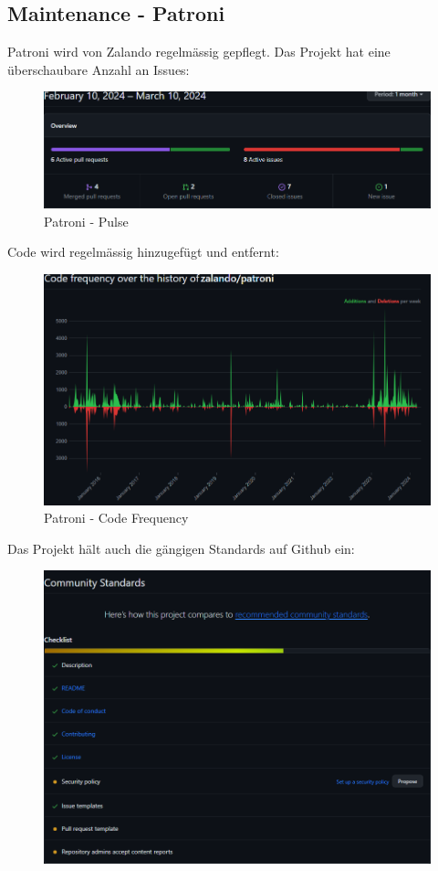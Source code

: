 
\begin{flushleft}
    \subsection{Maintenance - Patroni}
    \label{subsec:maintenance_patroni}
    Patroni wird von Zalando regelmässig gepflegt.
    Das Projekt hat eine überschaubare Anzahl an Issues:
    \begin{figure}[H]
        \centering
        \includegraphics[width=0.75\linewidth]{source/implementation/evaluation/postgresql_ha_solutions/insights/patroni/pulse_zalando_patroni}
        \caption{Patroni - Pulse}
        \label{fig:pulse_zalando_patroni}
    \end{figure}
    Code wird regelmässig hinzugefügt und entfernt:
    \begin{figure}[H]
        \centering
        \includegraphics[width=0.75\linewidth]{source/implementation/evaluation/postgresql_ha_solutions/insights/patroni/code_frequency_zalando_patroni}
        \caption{Patroni - Code Frequency}
        \label{fig:code_frequency_zalando_patroni}
    \end{figure}
    Das Projekt hält auch die gängigen Standards auf Github ein:
    \begin{figure}[H]
        \centering
        \includegraphics[width=0.75\linewidth]{source/implementation/evaluation/postgresql_ha_solutions/insights/patroni/community_Standards_zalando_patroni}

\end{figure}
\end{flushleft}
